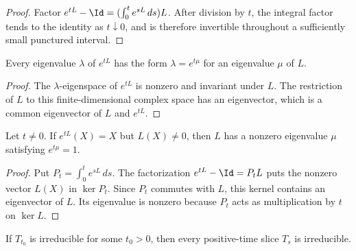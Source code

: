 \begin{proof}
    \leanok
    Factor
    $e^{tL}-\Id=(\int_0^t e^{sL}\,ds)L$.  After division by $t$, the integral
    factor tends to the identity as $t\downarrow0$, and is therefore invertible
    throughout a sufficiently small punctured interval.
\end{proof}

\begin{theorem}
    \label{thm:reverse_spectral_mapping_exp_ch12}
    \leanok
    Every eigenvalue $\lambda$ of $e^{tL}$ has the form
    $\lambda=e^{t\mu}$ for an eigenvalue $\mu$ of $L$.
\end{theorem}

\begin{proof}
    \leanok
    The $\lambda$-eigenspace of $e^{tL}$ is nonzero and invariant under $L$.
    The restriction of $L$ to this finite-dimensional complex space has an
    eigenvector, which is a common eigenvector of $L$ and $e^{tL}$.
\end{proof}

\begin{theorem}
    \label{thm:reverse_fixed_space_resonance_ch12}
    \leanok
    Let $t\ne0$.  If $e^{tL}(X)=X$ but $L(X)\ne0$, then $L$ has a nonzero
    eigenvalue $\mu$ satisfying $e^{t\mu}=1$.
\end{theorem}

\begin{proof}
    \leanok
    Put $P_t=\int_0^t e^{sL}\,ds$.  The factorization
    $e^{tL}-\Id=P_tL$ puts the nonzero vector $L(X)$ in $\ker P_t$.
    Since $P_t$ commutes with $L$, this kernel contains an eigenvector of $L$.
    Its eigenvalue is nonzero because $P_t$ acts as multiplication by $t$ on
    $\ker L$.
\end{proof}


\begin{theorem}
    \label{thm:irreducible_all_of_irreducible_time_ch12}
    \leanok
    If $T_{t_0}$ is irreducible for some $t_0>0$, then every positive-time slice $T_s$ is
    irreducible.
\end{theorem}

